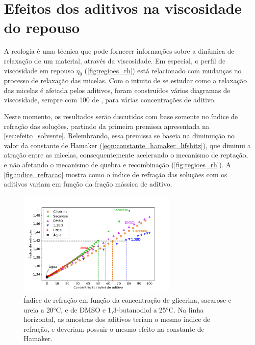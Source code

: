 		\section{Efeitos dos aditivos na viscosidade do repouso} 
			\label{sec:efeito_aditivos_viscosidade}  
			A reologia é uma técnica que pode fornecer informações sobre a dinâmica de relaxação de um material, através da viscosidade. Em especial, o perfil de viscosidade em repouso \(\eta_0\) (\autoref{fig:regioes_rh}) está relacionado com mudanças no processo de relaxação das micelas. Com o intuito de se estudar como a relaxação das micelas é afetada pelos aditivos, foram construídos vários diagramas de viscosidade, sempre com 100 \mM{} de \CTAB, para várias concentrações de aditivo.
			
			Neste momento, os resultados serão discutidos com base somente no índice de refração das soluções, partindo da primeira premissa apresentada na \autoref{sec:efeito_solvente}. Relembrando, essa premissa se baseia na diminuição no valor da constante de Hamaker (\autoref{eqn:constante_hamaker_lifshitz}), que diminui a atração entre as micelas, consequentemente acelerando o mecanismo de reptação, e não afetando o mecanismo de quebra e recombinação (\autoref{fig:regioes_rh}). A \autoref{fig:indice_refracao} mostra como o índice de refração das soluções com os aditivos variam em função da fração mássica de aditivo.
					
			\begin{figure}[h]
				\centering
				\includegraphics[width=0.7\textwidth]{imagens/propriedades/indice_refracao}
				\caption{Índice de refração  em função da concentração de glicerina, sacarose e ureia a 20°C\cite{Lide2003}, e de DMSO\cite{Lebel1962} e 1,3-butanodiol\cite{Piekarski1995} a 25°C. Na linha horizontal, as amostras dos aditivos teriam o mesmo índice de refração, e deveriam possuir o mesmo efeito na constante de Hamaker.}
				\label{fig:indice_refracao}
			\end{figure} 
	
